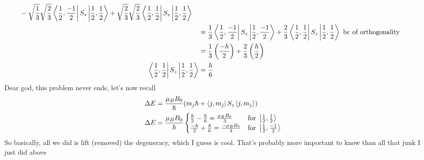 \documentclass{article}
\begin{document}
\begin{enumerate}[label=\alph*)]
\begin{align*}
\begin{split}
		\\ &- \sqrt{\frac{1}{3}}\sqrt{\frac{2}{3}} \bra{\frac{1}{2}, \frac{-1}{2}}S_z\ket{\frac{1}{2}, \frac{1}{2}} + \sqrt{\frac{2}{3}}\sqrt{\frac{2}{3}}\bra{\frac{1}{2}, \frac{1}{2}} S_z\ket{\frac{1}{2}, \frac{1}{2}} 
	\end{split} \\
		&= \frac{1}{3} \bra{\frac{1}{2}, \frac{-1}{2}}S_z\ket{\frac{1}{2}, \frac{-1}{2}} + \frac{2}{3}\bra{\frac{1}{2}, \frac{1}{2}} S_z\ket{\frac{1}{2}, \frac{1}{2}} \text{ bc of orthogonality} \\
		&= \frac{1}{3}\left(\frac{-\hbar}{2}\right) + \frac{2}{3}\left(\frac{\hbar}{2}\right)\\ 
		\bra{\frac{1}{2},\frac{1}{2}}S_z\ket{\frac{1}{2},\frac{1}{2}} &= \frac{\hbar}{6}
	\end{align*}
	Dear god, this problem never ends, let's now recall
	\begin{align*}
		\Delta E &= \frac{\mu_{B}B_0}{\hbar}(m_j\hbar +\bra{j, m_j}S_z\ket{j, m_j}) \\ 
		\Delta E &= \frac{\mu_{B}B_0}{\hbar} \begin{cases} 
      		\frac{\hbar}{2} - \frac{\hbar}{6} = \frac{\mu_{B}B_0}{3} & \text{for } \ket{\frac{1}{2}, \frac{1}{2}}\\
		\frac{-\hbar}{2} + \frac{\hbar}{6} = \frac{-\mu_{B}B_0}{3} & \text{for } \ket{\frac{1}{2}, \frac{-1}{2}}
   	\end{cases}
	\end{align*}
	So basically, all we did is lift (removed) the degeneracy, which I guess is cool. That's probably more important to know than all that junk I just did above
\end{enumerate}
	
\end{document}
